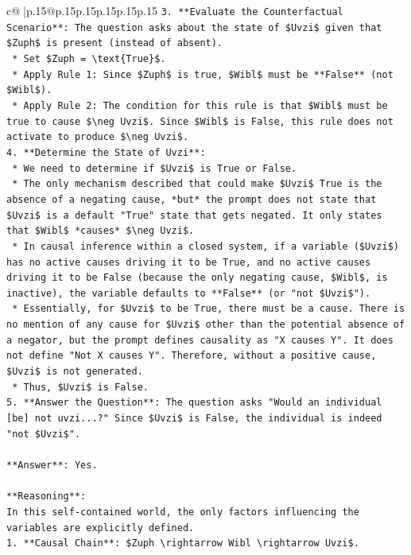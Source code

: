 \documentclass{article}
\begin{document}
{\begin{supertabular}{c@{$\;$}|p{.15\linewidth}@{}p{.15\linewidth}p{.15\linewidth}p{.15\linewidth}p{.15\linewidth}p{.15\linewidth}}
{{{\texttt{3.  **Evaluate the Counterfactual Scenario**: The question asks about the state of \$Uvzi\$ given that \$Zuph\$ is present (instead of absent).} \\
\texttt{    *   Set \$Zuph = \textbackslash{}text\{True\}\$.} \\
\texttt{    *   Apply Rule 1: Since \$Zuph\$ is true, \$Wibl\$ must be **False** (not \$Wibl\$).} \\
\texttt{    *   Apply Rule 2: The condition for this rule is that \$Wibl\$ must be true to cause \$\textbackslash{}neg Uvzi\$. Since \$Wibl\$ is False, this rule does not activate to produce \$\textbackslash{}neg Uvzi\$.} \\
\texttt{4.  **Determine the State of Uvzi**:} \\
\texttt{    *   We need to determine if \$Uvzi\$ is True or False.} \\
\texttt{    *   The only mechanism described that could make \$Uvzi\$ True is the absence of a negating cause, *but* the prompt does not state that \$Uvzi\$ is a default "True" state that gets negated. It only states that \$Wibl\$ *causes* \$\textbackslash{}neg Uvzi\$.} \\
\texttt{    *   In causal inference within a closed system, if a variable (\$Uvzi\$) has no active causes driving it to be True, and no active causes driving it to be False (because the only negating cause, \$Wibl\$, is inactive), the variable defaults to **False** (or "not \$Uvzi\$").} \\
\texttt{    *   Essentially, for \$Uvzi\$ to be True, there must be a cause. There is no mention of any cause for \$Uvzi\$ other than the potential absence of a negator, but the prompt defines causality as "X causes Y". It does not define "Not X causes Y". Therefore, without a positive cause, \$Uvzi\$ is not generated.} \\
\texttt{    *   Thus, \$Uvzi\$ is False.} \\
\texttt{5.  **Answer the Question**: The question asks "Would an individual {[}be{]} not uvzi...?" Since \$Uvzi\$ is False, the individual is indeed "not \$Uvzi\$".} \\
\\ 
\texttt{**Answer**: Yes.} \\
\\ 
\texttt{**Reasoning**:} \\
\texttt{In this self{-}contained world, the only factors influencing the variables are explicitly defined.} \\
\texttt{1.  **Causal Chain**: \$Zuph \textbackslash{}rightarrow Wibl \textbackslash{}rightarrow Uvzi\$.} \\
}}}
\end{supertabular}}
\end{document}
